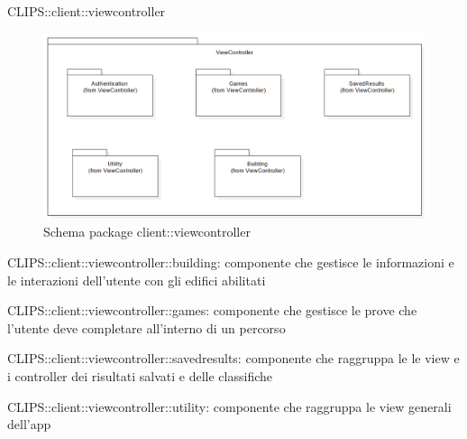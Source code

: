 \begin{componente}{CLIPS::client::viewcontroller}
\begin{figure}[h!]
\centering
\includegraphics[scale=0.4]{img/package/png/client--viewcontroller.png}
\caption{Schema package client::viewcontroller}
 \end{figure}
\begin{compPackageContenuti}
\item CLIPS::client::viewcontroller::building: componente che gestisce le informazioni e le interazioni dell'utente con gli edifici abilitati
\item CLIPS::client::viewcontroller::games: componente che gestisce le prove che l'utente deve completare all'interno di un percorso
\item CLIPS::client::viewcontroller::savedresults: componente che raggruppa le le view e i controller dei risultati salvati e delle classifiche
\item CLIPS::client::viewcontroller::utility: componente che raggruppa le view generali dell'app
\end{compPackageContenuti}
\end{componente}
